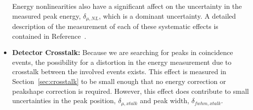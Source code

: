 \documentclass[/main.tex]{subfiles}
\begin{document}
\begin{itemize}
  Energy nonlinearities also have a significant affect on the uncertainty in the measured peak energy, $\delta_{\mu,NL}$, which is a dominant uncertainty.
  A detailed description of the measurement of each of these systematic effects is contained in Reference~\cite{energysystunidoc}.
\item \textbf{Detector Crosstalk:} Because we are searching for peaks in coincidence events, the possibility for a distortion in the energy measurement due to crosstalk between the involved events exists.
  This effect is measured in Section~\ref{sec:crosstalk} to be small enough that no energy correction or peakshape correction is required.
  However, this effect does contribute to small uncertainties in the peak position, $\delta_{\mu,xtalk}$ and peak width, $\delta_{fwhm,xtalk}$.
\end{itemize}
\end{document}
